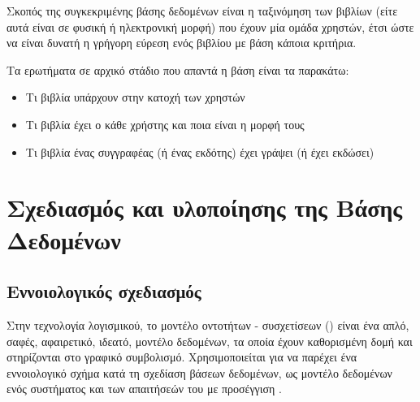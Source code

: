 \documentclass{assignment}
\begin{document}

Σκοπός της συγκεκριμένης βάσης δεδομένων είναι η ταξινόμηση των βιβλίων (είτε αυτά είναι σε φυσική ή ηλεκτρονική μορφή) που έχουν μία ομάδα χρηστών, έτσι ώστε να είναι δυνατή η γρήγορη εύρεση ενός βιβλίου με βάση κάποια κριτήρια. 

Τα ερωτήματα σε αρχικό στάδιο που απαντά η βάση είναι τα παρακάτω:

\begin{itemize}
  \item Τι βιβλία υπάρχουν στην κατοχή των χρηστών
  \item Τι βιβλία έχει ο κάθε χρήστης και ποια είναι η μορφή τους
  \item Τι βιβλία ένας συγγραφέας (ή ένας εκδότης) έχει γράψει (ή έχει εκδώσει)
\end{itemize}







\section{Σχεδιασμός και υλοποίησης της Βάσης Δεδομένων}

\subsection{Εννοιολογικός σχεδιασμός}

Στην τεχνολογία λογισμικού, το μοντέλο οντοτήτων - συσχετίσεων () είναι ένα απλό, σαφές, αφαιρετικό, ιδεατό, μοντέλο δεδομένων, τα οποία έχουν καθορισμένη δομή και στηρίζονται στο γραφικό συμβολισμό. Χρησιμοποιείται για να παρέχει ένα εννοιολογικό σχήμα κατά τη σχεδίαση βάσεων δεδομένων, ως μοντέλο δεδομένων ενός συστήματος και των απαιτήσεών του με  προσέγγιση \cite{wiki:Entity_relationship_model, class_notes}.
\end{document}

